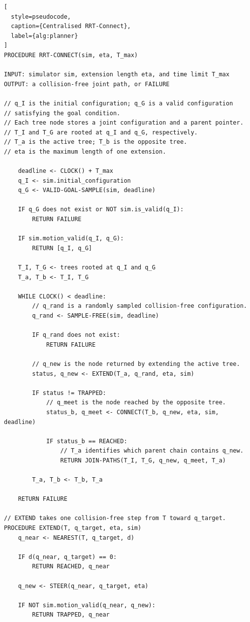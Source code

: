 \documentclass[11pt,a4paper]{article}
\begin{document}
\begin{lstlisting}[
  style=pseudocode,
  caption={Centralised RRT-Connect},
  label={alg:planner}
]
PROCEDURE RRT-CONNECT(sim, eta, T_max)

INPUT: simulator sim, extension length eta, and time limit T_max
OUTPUT: a collision-free joint path, or FAILURE

// q_I is the initial configuration; q_G is a valid configuration
// satisfying the goal condition.
// Each tree node stores a joint configuration and a parent pointer.
// T_I and T_G are rooted at q_I and q_G, respectively.
// T_a is the active tree; T_b is the opposite tree.
// eta is the maximum length of one extension.

    deadline <- CLOCK() + T_max
    q_I <- sim.initial_configuration
    q_G <- VALID-GOAL-SAMPLE(sim, deadline)

    IF q_G does not exist or NOT sim.is_valid(q_I):
        RETURN FAILURE

    IF sim.motion_valid(q_I, q_G):
        RETURN [q_I, q_G]

    T_I, T_G <- trees rooted at q_I and q_G
    T_a, T_b <- T_I, T_G

    WHILE CLOCK() < deadline:
        // q_rand is a randomly sampled collision-free configuration.
        q_rand <- SAMPLE-FREE(sim, deadline)

        IF q_rand does not exist:
            RETURN FAILURE

        // q_new is the node returned by extending the active tree.
        status, q_new <- EXTEND(T_a, q_rand, eta, sim)

        IF status != TRAPPED:
            // q_meet is the node reached by the opposite tree.
            status_b, q_meet <- CONNECT(T_b, q_new, eta, sim, deadline)

            IF status_b == REACHED:
                // T_a identifies which parent chain contains q_new.
                RETURN JOIN-PATHS(T_I, T_G, q_new, q_meet, T_a)

        T_a, T_b <- T_b, T_a

    RETURN FAILURE

// EXTEND takes one collision-free step from T toward q_target.
PROCEDURE EXTEND(T, q_target, eta, sim)
    q_near <- NEAREST(T, q_target, d)

    IF d(q_near, q_target) == 0:
        RETURN REACHED, q_near

    q_new <- STEER(q_near, q_target, eta)

    IF NOT sim.motion_valid(q_near, q_new):
        RETURN TRAPPED, q_near


\end{lstlisting}
\end{document}

